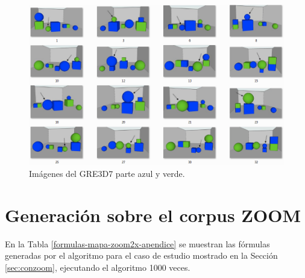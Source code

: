 \begin{figure}[h]
\centering
\includegraphics[width=1\textwidth]{images/corpusVerdeAzul.png}
\caption{Im\'agenes del GRE3D7 parte azul y verde.}
\label{verde-azul}
\end{figure}


\section{Generaci\'on sobre el corpus ZOOM} \label{er-mapa-zoom}

En la Tabla \ref{formulas-mapa-zoom2x-apendice} se muestran las f\'ormulas generadas por el algoritmo para el caso de estudio mostrado en la Secci\'on \ref{sec:conzoom}, ejecutando el algoritmo 1000 veces.

